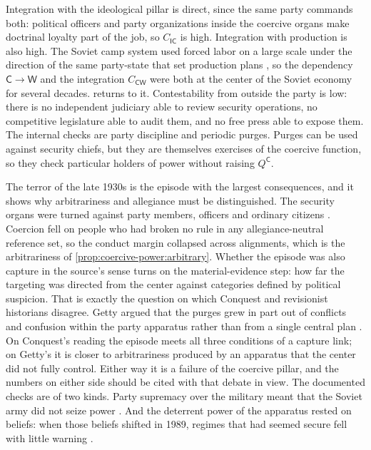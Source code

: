 \documentclass[11pt,letterpaper]{article}
\theoremstyle{definition}
\theoremstyle{remark}
\newcommand{\pI}{\mathsf{I}}
\newcommand{\pC}{\mathsf{C}}
\newcommand{\pW}{\mathsf{W}}
\begin{document}
Integration with the ideological pillar is direct, since the same party commands both: political officers and party organizations inside the coercive organs make doctrinal loyalty part of the job, so $C_{\pI\pC}$ is high. Integration with production is also high. The Soviet camp system used forced labor on a large scale under the direction of the same party-state that set production plans \citep{applebaum2003,gregory2003}, so the dependency $\pC \to \pW$ and the integration $C_{\pC\pW}$ were both at the center of the Soviet economy for several decades.  returns to it. Contestability from outside the party is low: there is no independent judiciary able to review security operations, no competitive legislature able to audit them, and no free press able to expose them. The internal checks are party discipline and periodic purges. Purges can be used against security chiefs, but they are themselves exercises of the coercive function, so they check particular holders of power without raising $Q^{\pC}$.

The terror of the late 1930s is the episode with the largest consequences, and it shows why arbitrariness and allegiance must be distinguished. The security organs were turned against party members, officers and ordinary citizens \citep{conquest1990}. Coercion fell on people who had broken no rule in any allegiance-neutral reference set, so the conduct margin collapsed across alignments, which is the arbitrariness of \cref{prop:coercive-power:arbitrary}. Whether the episode was also capture in the source's sense turns on the material-evidence step: how far the targeting was directed from the center against categories defined by political suspicion. That is exactly the question on which Conquest and revisionist historians disagree. Getty argued that the purges grew in part out of conflicts and confusion within the party apparatus rather than from a single central plan \citep{getty1985}. On Conquest's reading the episode meets all three conditions of a capture link; on Getty's it is closer to arbitrariness produced by an apparatus that the center did not fully control. Either way it is a failure of the coercive pillar, and the numbers on either side should be cited with that debate in view. The documented checks are of two kinds. Party supremacy over the military meant that the Soviet army did not seize power \citep{colton1979}. And the deterrent power of the apparatus rested on beliefs: when those beliefs shifted in 1989, regimes that had seemed secure fell with little warning \citep{kuran1991}.
\end{document}
